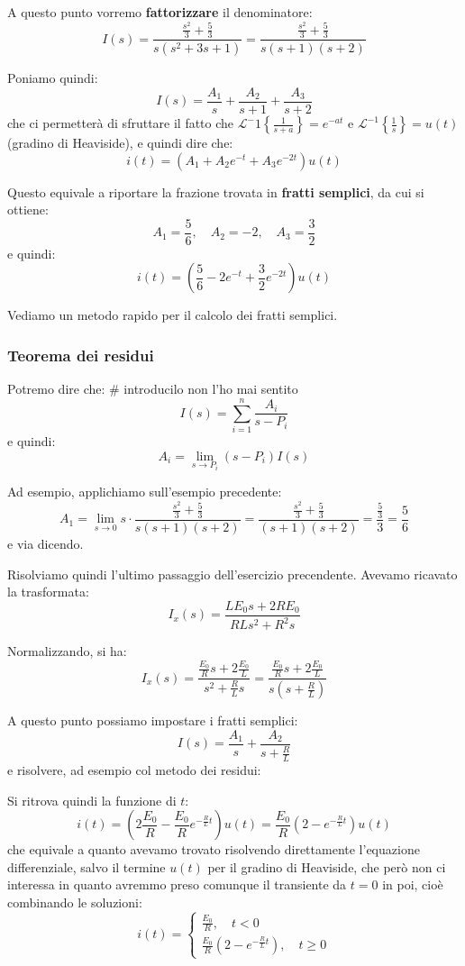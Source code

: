 \documentclass[a4paper,11pt]{article}
\begin{document}
A questo punto vorremo \textbf{fattorizzare} il denominatore:
$$
I(s) = \frac{\frac{s^2}{3} + \frac{5}{3}}{s (s^2 + 3s +1)} = \frac{\frac{s^2}{3} + \frac{5}{3}}{s (s + 1) (s + 2)}
$$

Poniamo quindi:
$$
I(s) = \frac{A_1}{s} + \frac{A_2}{s + 1} + \frac{A_3}{s+2}
$$
che ci permetterà di sfruttare il fatto che $\mathcal{L}^-1\left\{ \frac{1}{s + a} \right\} = e^{-at}$ e $\mathcal{L}^{-1} \left\{ \frac{1}{s} \right\} = u(t)$ (gradino di Heaviside), e quindi dire che:
$$
i(t) = \left( A_1 + A_2 e^{-t} + A_3 e^{-2t} \right) u(t)
$$

Questo equivale a riportare la frazione trovata in \textbf{fratti semplici}, da cui si ottiene:
$$
A_1 = \frac{5}{6}, \quad A_2 = -2, \quad A_3 = \frac{3}{2} 
$$
e quindi:
$$
i(t) = \left( \frac{5}{6} -2e^{-t} + \frac{3}{2}e^{-2t} \right) u(t)
$$

Vediamo un metodo rapido per il calcolo dei fratti semplici.

\subsubsection{Teorema dei residui}
Potremo dire che: # introducilo non l'ho mai sentito
$$
I(s) = \sum_{i = 1}^n \frac{A_i}{s - P_i}
$$
e quindi:
$$
A_i = \lim_{s \rightarrow P_i} (s - P_i) I(s)
$$

Ad esempio, applichiamo sull'esempio precedente:
$$
A_1 = \lim_{s \rightarrow 0} s \cdot \frac{\frac{s^2}{3} + \frac{5}{3}}{s(s+1)(s+2)}
= \frac{\frac{s^2}{3} + \frac{5}{3}}{(s+1)(s+2)} = \frac{\frac{5}{3}}{3} = \frac{5}{6}
$$
e via dicendo.

\par\smallskip

Risolviamo quindi l'ultimo passaggio dell'esercizio precendente.
Avevamo ricavato la trasformata:
$$
I_x(s) = \frac{L E_0 s + 2 R E_0}{R L s^2 + R^2 s}
$$

Normalizzando, si ha:
$$
I_x(s) = \frac{\frac{E_0}{R} s + 2 \frac{E_0}{L}}{s^2 + \frac{R}{L}s} = \frac{\frac{E_0}{R} s + 2 \frac{E_0}{L}}{s \left(s + \frac{R}{L}\right)}
$$

A questo punto possiamo impostare i fratti semplici:
$$
I(s) = \frac{A_1}{s} + \frac{A_2}{s + \frac{R}{L}}
$$
e risolvere, ad esempio col metodo dei residui:

Si ritrova quindi la funzione di $t$:
$$
i(t) = \left( 2\frac{E_0}{R} - \frac{E_0}{R} e^{-\frac{R}{L}t} \right) u(t) = \frac{E_0}{R} \left( 2 - e^{-\frac{R}{L}t} \right) u(t)
$$
che equivale a quanto avevamo trovato risolvendo direttamente l'equazione differenziale, salvo il termine $u(t)$ per il gradino di Heaviside, che però non ci interessa in quanto avremmo preso comunque il transiente da $t = 0$ in poi, cioè combinando le soluzioni:
\[
	i(t) = 
	\begin{cases}
		\frac{E_0}{R}, \quad t < 0 \\ 
		\frac{E_0}{R} \left( 2 - e^{-\frac{R}{L}t} \right), \quad t \geq 0
	\end{cases}
\]
\end{document}
